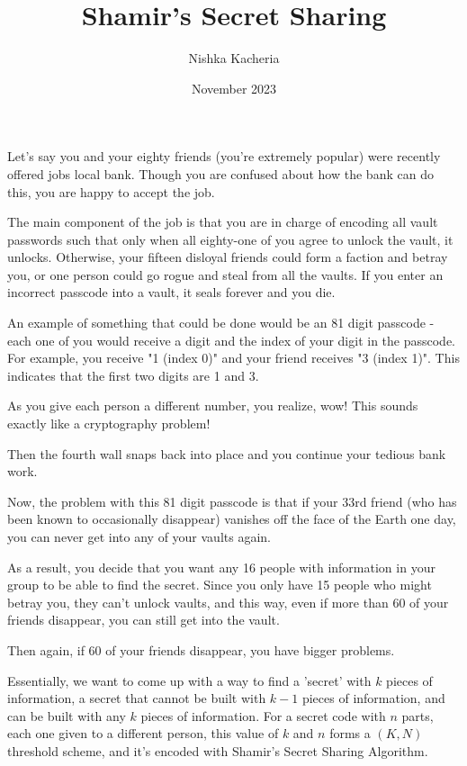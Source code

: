 \documentclass{article}
\title{Shamir's Secret Sharing}
\author{Nishka Kacheria}
\date{November 2023}
\theoremstyle{remark}
\theoremstyle{problem}
\numberwithin{problem}{subsection}
\numberwithin{Problem}{section}
\theoremstyle{definition}
\theoremstyle{definition}
\begin{document}
\maketitle

Let's say you and your eighty friends (you're extremely popular) were recently offered jobs local bank. Though you are confused about how the bank can do this, you are happy to accept the job. 

The main component of the job is that you are in charge of encoding all vault passwords such that only when all eighty-one of you agree to unlock the vault, it unlocks. Otherwise, your fifteen disloyal friends could form a faction and betray you, or one person could go rogue and steal from all the vaults. If you enter an incorrect passcode into a vault, it seals forever and you die. 

An example of something that could be done would be an 81 digit passcode - each one of you would receive a digit and the index of your digit in the passcode. For example, you receive "1 (index 0)" and your friend receives "3 (index 1)". This indicates that the first two digits are 1 and 3. 

As you give each person a different number, you realize, wow! This sounds exactly like a cryptography problem!

Then the fourth wall snaps back into place and you continue your tedious bank work. 

Now, the problem with this 81 digit passcode is that if your 33rd friend (who has been known to occasionally disappear) vanishes off the face of the Earth one day, you can never get into any of your vaults again. 

As a result, you decide that you want any 16 people with information in your group to be able to find the secret. Since you only have 15 people who might betray you, they can't unlock vaults, and this way, even if more than 60 of your friends disappear, you can still get into the vault. 

Then again, if 60 of your friends disappear, you have bigger problems. 

Essentially, we want to come up with a way to find a 'secret' with $k$ pieces of information, a secret that cannot be built with $k-1$ pieces of information, and can be built with any $k$ pieces of information. For a secret code with $n$ parts, each one given to a different person, this value of $k$ and $n$ forms a $(K, N)$ threshold scheme, and it's encoded with Shamir's Secret Sharing Algorithm.
\end{document}
